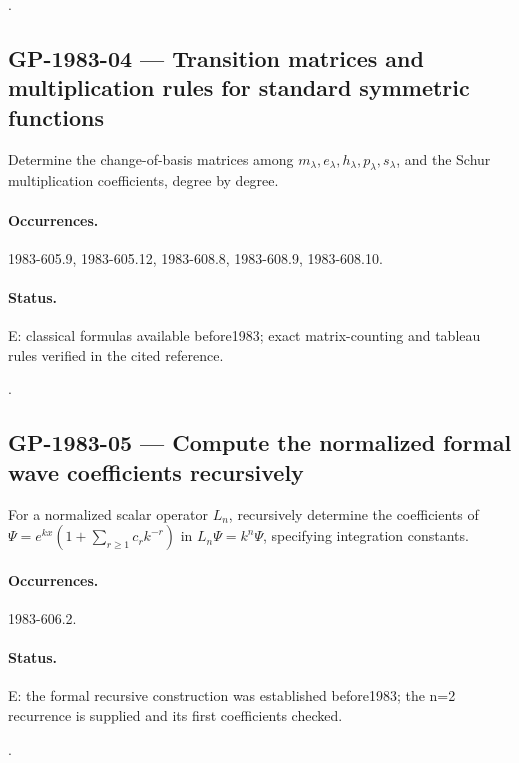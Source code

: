 \noindent\citep{daifreed1994eta,wangwenwitten2019new}.

\subsection{GP-1983-04 --- Transition matrices and multiplication rules for standard symmetric functions}

\label{problem:GP-1983-04}

Determine the change-of-basis matrices among \(m_\lambda,e_\lambda,h_\lambda,p_\lambda,s_\lambda\), and the Schur multiplication coefficients, degree by degree.

\paragraph{Occurrences.} 1983-605.9, 1983-605.12, 1983-608.8, 1983-608.9, 1983-608.10.

\paragraph{Status.} E: classical formulas available before1983; exact matrix-counting and tableau rules verified in the cited reference.

\noindent\citep{macdonald1995symmetric}.

\subsection{GP-1983-05 --- Compute the normalized formal wave coefficients recursively}

\label{problem:GP-1983-05}

For a normalized scalar operator \(L_n\), recursively determine the coefficients of \(\Psi=e^{kx}(1+\sum_{r\ge1}c_rk^{-r})\) in \(L_n\Psi=k^n\Psi\), specifying integration constants.

\paragraph{Occurrences.} 1983-606.2.

\paragraph{Status.} E: the formal recursive construction was established before1983; the n=2 recurrence is supplied and its first coefficients checked.

\noindent\citep{cherednik1978differential}.

